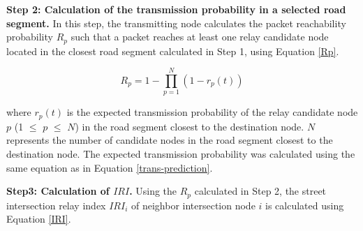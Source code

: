 \documentclass[conference]{IEEEtran}
\begin{document}
\textbf{Step 2: Calculation of the transmission probability in a selected road segment.}
In this step, the transmitting node calculates the packet reachability probability $R_p$ such that a packet reaches at least one relay candidate node located in the closest road segment calculated in Step 1, using Equation \ref{Rp}.

\begin{equation}
\label{Rp}
R_p = 1 - \prod_{p=1}^N (1 - r_{p}(t))
\end{equation}

where $r_p(t)$ is the expected transmission probability of the relay candidate node $p$ (1 $\leq$  $p$ $\leq$ $N$) in the road segment closest to the destination node. 
$N$ represents the number of candidate nodes in the road segment closest to the destination node. 
The expected transmission probability was calculated using the same equation as in Equation \ref{trans-prediction}.




\textbf{Step3: Calculation of $IRI$.}
Using the $R_p$ calculated in Step 2, the street intersection relay  index $IRI_i$ of neighbor intersection node $i$ is calculated using Equation \ref{IRI}.
\end{document}
